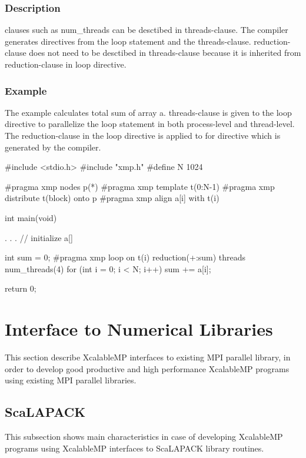 \subsection*{Description}

   {\OMP} clauses such as num\_threads can be desctibed in threads-clause.
   The {\XMP} compiler generates {\OMP} directives from the {\XMP} loop statement and the threads-clause.
   reduction-clause does not need to be desctibed in threads-clause
   because it is inherited from reduction-clause in {\XMP} loop directive.

\subsection*{Example}

   The example calculates total sum of array a.
   threads-clause is given to the loop directive to parallelize the loop statement in both process-level and thread-level.
   The reduction-clause in the loop directive is applied to {\OMP} for directive which is generated by the {\XMP} compiler.

\begin{XCexample}
#include <stdio.h>
#include "xmp.h"
#define N 1024

#pragma xmp nodes p(*)
#pragma xmp template t(0:N-1)
#pragma xmp distribute t(block) onto p
#pragma xmp align a[i] with t(i)

int main(void) {
  . . . // initialize a[]

  int sum = 0;
#pragma xmp loop on t(i) reduction(+:sum) threads num\_threads(4)
  for (int i = 0; i < N; i++) {
    sum += a[i];
  }

  return 0;
}
\end{XCexample}


\chapter{Interface to Numerical Libraries}

   This section describe XcalableMP interfaces to existing MPI parallel library, 
   in order to develop good productive and high performance XcalableMP programs 
   using existing MPI parallel libraries.
   
\section{ScaLAPACK}

   This subsection shows main characteristics in case of developing
   XcalableMP programs using XcalableMP interfaces to ScaLAPACK library routines.

